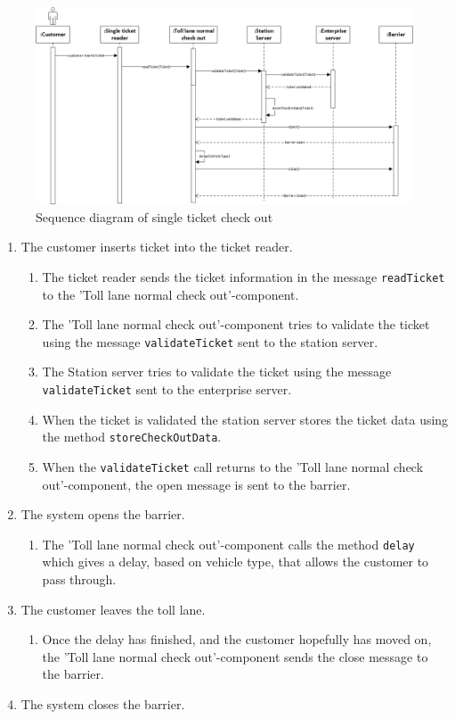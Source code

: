 \documentclass[11pt]{article}
\begin{document}
\begin{figure}[h]
\centering
\includegraphics[width=0.7\linewidth]{../report/img/sequence_diagrams/sequence_diagram_single_ticket_check_out.png}
\caption[fig1]{Sequence diagram of single ticket check out}
\label{fig1}
\end{figure}

\begin{enumerate}
\item The customer inserts ticket into the ticket reader.
\begin{enumerate}
\item The ticket reader sends the ticket information in the message \texttt{readTicket} to the 'Toll lane normal check out'-component.
\item The 'Toll lane normal check out'-component tries to validate the ticket using the message \texttt{validateTicket} sent to the station server.
\item The Station server tries to validate the ticket using the message \texttt{validateTicket} sent to the enterprise server.
\item When the ticket is validated the station server stores the ticket data using the method \texttt{storeCheckOutData}.
\item When the \texttt{validateTicket} call returns to the 'Toll lane normal check out'-component, the open message is sent to the barrier.
\end{enumerate}
\item The system opens the  barrier.
\begin{enumerate}
\item The 'Toll lane normal check out'-component calls the method \texttt{delay} which gives a delay, based on vehicle type, that allows the customer to pass through.
\end{enumerate}
\item The customer leaves the toll lane.
\begin{enumerate}
\item Once the delay has finished, and the customer hopefully has moved on, the 'Toll lane normal check out'-component sends the close message to the barrier.
\end{enumerate}
\item The system closes the barrier.

\end{enumerate}
\end{document}
